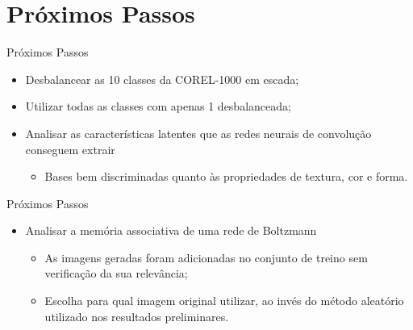 \documentclass{beamer}
\begin{document}
\section{Próximos Passos}
\begin{frame}{Próximos Passos}
\setlength\leftmargini{0em}
\justifying
  \begin{itemize}
  \item Desbalancear as 10 classes da COREL-1000 em escada;
  \item Utilizar todas as classes com apenas 1 desbalanceada;
  \item Analisar as características latentes que as redes neurais de convolução conseguem extrair
    \begin{itemize}
      \item Bases bem discriminadas quanto às propriedades de textura, cor e forma.
    \end{itemize}
  \end{itemize}
\end{frame}
\begin{frame}{Próximos Passos}
\setlength\leftmargini{0em}
\justifying
  \begin{itemize}
  \item Analisar a memória associativa de uma rede de Boltzmann 
  \begin{itemize}
    \item As imagens geradas foram adicionadas no conjunto de treino sem verificação da sua relevância;
    \item Escolha para qual imagem original utilizar, ao invés do método aleatório utilizado nos resultados preliminares.
  \end{itemize}
  \end{itemize}
\end{frame}
\end{document}
